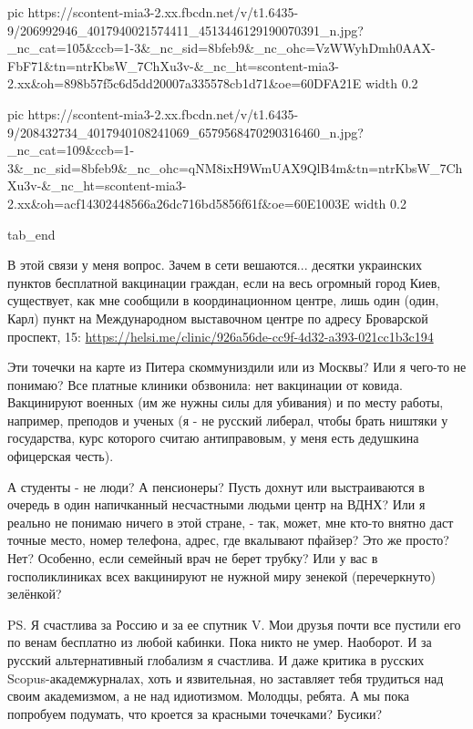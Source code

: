      pic https://scontent-mia3-2.xx.fbcdn.net/v/t1.6435-9/206992946_4017940021574411_4513446129190070391_n.jpg?_nc_cat=105&ccb=1-3&_nc_sid=8bfeb9&_nc_ohc=VzWWyhDmh0AAX-FbF71&tn=ntrKbsW_7ChXu3v-&_nc_ht=scontent-mia3-2.xx&oh=898b57f5c6d5dd20007a335578cb1d71&oe=60DFA21E
     width 0.2

     pic https://scontent-mia3-2.xx.fbcdn.net/v/t1.6435-9/208432734_4017940108241069_6579568470290316460_n.jpg?_nc_cat=109&ccb=1-3&_nc_sid=8bfeb9&_nc_ohc=qNM8ixH9WmUAX9QlB4m&tn=ntrKbsW_7ChXu3v-&_nc_ht=scontent-mia3-2.xx&oh=acf14302448566a26dc716bd5856f61f&oe=60E1003E
     width 0.2

  tab_end
\fi

В этой связи у меня вопрос. Зачем в сети вешаются... десятки украинских пунктов
бесплатной вакцинации граждан, если на весь огромный город Киев, существует,
как мне сообщили в координационном центре, лишь один (один, Карл) пункт на
Международном выставочном центре по адресу Броварской проспект, 15:
\url{https://helsi.me/clinic/926a56de-cc9f-4d32-a393-021cc1b3c194}

Эти точечки на карте из Питера скоммуниздили или из Москвы? Или я чего-то не
понимаю? Все платные клиники обзвонила: нет вакцинации от ковида. Вакцинируют
военных (им же нужны силы для убивания) и по месту работы, например, преподов и
ученых (я - не русский либерал, чтобы брать ништяки у государства, курс
которого считаю антиправовым, у меня есть дедушкина офицерская честь). 

А студенты - не люди? А пенсионеры? Пусть дохнут или выстраиваются в очередь в
один напичканный несчастными людьми центр на ВДНХ? Или я реально не понимаю
ничего в этой стране, - так, может, мне кто-то внятно даст точные место, номер
телефона, адрес, где вкалывают пфайзер? Это же просто? Нет? Особенно, если
семейный врач не берет трубку? Или у вас в госполиклиниках всех вакцинируют не
нужной миру зенекой (перечеркнуто) зелёнкой?

PS. Я счастлива за Россию и за ее спутник V. Мои друзья почти все пустили его
по венам бесплатно из любой кабинки. Пока никто не умер. Наоборот. И за русский
альтернативный глобализм я счастлива. И даже критика в русских
Scopus-академжурналах, хоть и язвительная, но заставляет тебя трудиться над
своим академизмом, а не над идиотизмом. Молодцы, ребята. А мы пока попробуем
подумать, что кроется за красными точечками? Бусики?

